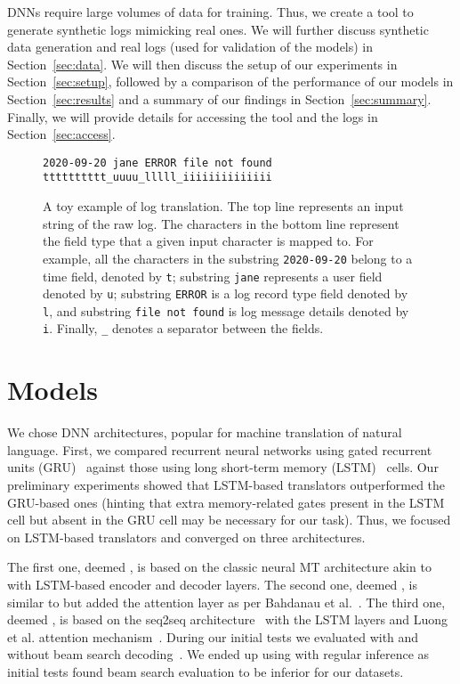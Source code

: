 \documentclass{article}
\begin{document}
DNNs require large volumes of data for training. Thus, we create a tool to generate synthetic logs mimicking real ones. We will further discuss synthetic data generation and real logs (used for validation of the models) in Section~\ref{sec:data}. 
We will then discuss the setup of our experiments in Section~\ref{sec:setup}, followed by a comparison of the performance of our models in Section~\ref{sec:results} and a summary of our findings in Section~\ref{sec:summary}. Finally, we will provide details for accessing the tool and the logs in Section~\ref{sec:access}.


\begin{figure}[bt]
    \centering
    \begin{framed}
    \small
    \texttt{2020-09-20 jane ERROR file not found} \\
    \texttt{tttttttttt\_uuuu\_lllll\_iiiiiiiiiiiiii} 
    \end{framed}
    \caption{A toy example of log translation. The top line represents an input string of the raw log. The characters in the bottom line represent the field type that a given input character is mapped to. For example, all the characters in the substring \texttt{2020-09-20} belong to a time field, denoted by \texttt{t}; substring \texttt{jane} represents a user field denoted by \texttt{u};  substring \texttt{ERROR} is a log record type field denoted by \texttt{l}, and  substring \texttt{file not found} is log message details denoted by \texttt{i}. Finally, \texttt{\_} denotes a separator between the fields. }
    \label{fig:toy}
\end{figure}

\section{Models} \label{sec:models}
We chose DNN architectures, popular for machine translation of natural language. First, we compared recurrent neural networks using gated recurrent units  (GRU)~\cite{DBLP:conf/emnlp/ChoMGBBSB14} against those using long short-term memory (LSTM)~\cite{DBLP:journals/neco/HochreiterS97} cells. Our preliminary experiments showed that LSTM-based translators outperformed the GRU-based ones (hinting that extra memory-related gates present in the LSTM cell but absent in the GRU cell may be necessary for our task). Thus, we focused on LSTM-based translators and converged on three architectures. 

The first one, deemed , is based on the classic neural MT architecture akin to~\cite{DBLP:conf/nips/SutskeverVL14} with LSTM-based encoder and decoder layers. The second one, deemed , is similar to  but added the attention layer as per Bahdanau et al.~\cite{DBLP:journals/corr/BahdanauCB14}. The third one, deemed , is based on the seq2seq architecture~\cite{DBLP:journals/corr/BritzGLL17} with the LSTM layers and  Luong et al. attention mechanism~\cite{DBLP:conf/emnlp/LuongPM15}. During our initial tests we evaluated  with and without beam search decoding~\cite{DBLP:journals/corr/WuSCLNMKCGMKSJL16}. We ended up using  with regular inference as initial tests found beam search evaluation to be inferior for our datasets.
\end{document}
